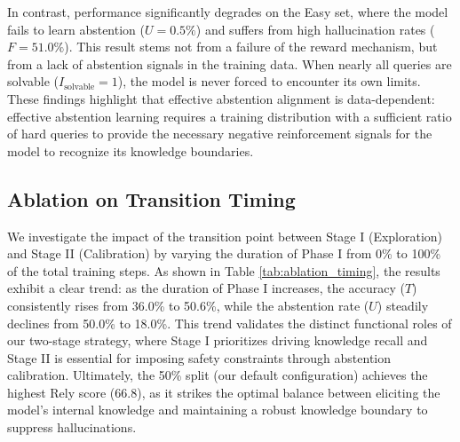 \documentclass{article} %
\begin{document}
In contrast, performance significantly degrades on the Easy set, where the model fails to learn abstention ($U=0.5\%$) and suffers from high hallucination rates ($F=51.0\%$). This result stems not from a failure of the reward mechanism, but from a lack of abstention signals in the training data. When nearly all queries are solvable ($I_{\text{solvable}}=1$), the model is never forced to encounter its own limits. These findings highlight that effective abstention alignment is data-dependent: effective abstention learning requires a training distribution with a sufficient ratio of hard queries to provide the necessary negative reinforcement signals for the model to recognize its knowledge boundaries.

\begin{table}[t]
\centering
\small
\renewcommand{\arraystretch}{1.15}
\caption{
Ablation study on the transition timing from Stage I (Exploration) to Stage II (Abstention Calibration).
}
\label{tab:ablation_timing}
\end{table}

\subsection{Ablation on Transition Timing}
\label{app: ablation on Transition timing}
We investigate the impact of the transition point between Stage I (Exploration) and Stage II (Calibration) by varying the duration of Phase I from 0\% to 100\% of the total training steps. As shown in Table \ref{tab:ablation_timing}, the results exhibit a clear trend: as the duration of Phase I increases, the accuracy ($T$) consistently rises from 36.0\% to 50.6\%, while the abstention rate ($U$) steadily declines from 50.0\% to 18.0\%. This trend validates the distinct functional roles of our two-stage strategy, where Stage I prioritizes driving knowledge recall and Stage II is essential for imposing safety constraints through abstention calibration. Ultimately, the 50\% split (our default configuration) achieves the highest Rely score (66.8), as it strikes the optimal balance between eliciting the model's internal knowledge and maintaining a robust knowledge boundary to suppress hallucinations.
\end{document}
